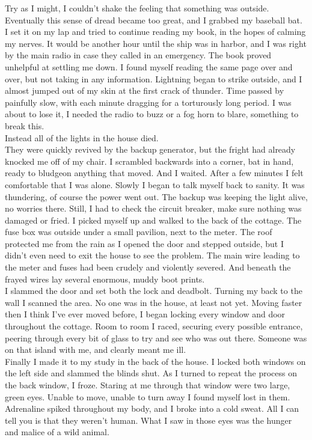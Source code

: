 \documentclass[a5paper]{scrartcl}
\begin{document}
Try as I might, I couldn't shake the feeling that something was outside. Eventually this sense of dread became too great, and I grabbed my baseball bat. I set it on my lap and tried to continue reading my book, in the hopes of calming my nerves. It would be another hour until the ship was in harbor, and I was right by the main radio in case they called in an emergency. The book proved unhelpful at settling me down. I found myself reading the same page over and over, but not taking in any information. Lightning began to strike outside, and I almost jumped out of my skin at the first crack of thunder. Time passed by painfully slow, with each minute dragging for a torturously long period. I was about to lose it, I needed the radio to buzz or a fog horn to blare, something to break this.\\


Instead all of the lights in the house died.\\


They were quickly revived by the backup generator, but the fright had already knocked me off of my chair. I scrambled backwards into a corner, bat in hand, ready to bludgeon anything that moved. And I waited. After a few minutes I felt comfortable that I was alone. Slowly I began to talk myself back to sanity. It was thundering, of course the power went out. The backup was keeping the light alive, no worries there. Still, I had to check the circuit breaker, make sure nothing was damaged or fried. I picked myself up and walked to the back of the cottage. The fuse box was outside under a small pavilion, next to the meter. The roof protected me from the rain as I opened the door and stepped outside, but I didn't even need to exit the house to see the problem. The main wire leading to the meter and fuses had been crudely and violently severed. And beneath the frayed wires lay several enormous, muddy boot prints.\\


I slammed the door and set both the lock and deadbolt. Turning my back to the wall I scanned the area. No one was in the house, at least not yet. Moving faster then I think I've ever moved before, I began locking every window and door throughout the cottage. Room to room I raced, securing every possible entrance, peering through every bit of glass to try and see who was out there. Someone was on that island with me, and clearly meant me ill. \\


Finally I made it to my study in the back of the house. I locked both windows on the left side and slammed the blinds shut. As I turned to repeat the process on the back window, I froze. Staring at me through that window were two large, green eyes. Unable to move, unable to turn away I found myself lost in them. Adrenaline spiked throughout my body, and I broke into a cold sweat. All I can tell you is that they weren't human. What I saw in those eyes was the hunger and malice of a wild animal.\\
\end{document}

